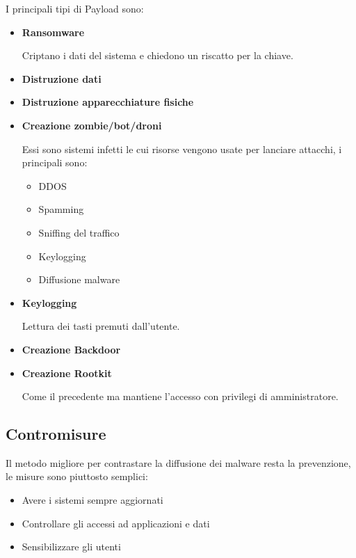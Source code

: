 \documentclass{article}
\begin{document}
I principali tipi di Payload sono:
\begin{itemize}

    \item \textbf{Ransomware}

        Criptano i dati del sistema e chiedono un riscatto per la chiave.

    \item \textbf{Distruzione dati}

    \item \textbf{Distruzione apparecchiature fisiche}

    \item \textbf{Creazione zombie/bot/droni}

        Essi sono sistemi infetti le cui risorse vengono usate per lanciare attacchi, i principali sono:
            \begin{itemize}
                \item DDOS
                \item Spamming
                \item Sniffing del traffico
                \item Keylogging
                \item Diffusione malware
            \end{itemize}

    \item \textbf{Keylogging}

        Lettura dei tasti premuti dall'utente.

    \item \textbf{Creazione Backdoor}

    \item \textbf{Creazione Rootkit}

        Come il precedente ma mantiene l'accesso con privilegi di amministratore.
    
\end{itemize}

\subsection{Contromisure}

Il metodo migliore per contrastare la diffusione dei malware resta la prevenzione, le misure sono piuttosto semplici:
\begin{itemize}
    \item Avere i sistemi sempre aggiornati
    \item Controllare gli accessi ad applicazioni e dati
    \item Sensibilizzare gli utenti\newline
\end{itemize}
\end{document}
